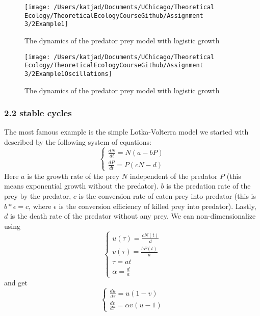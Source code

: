 \documentclass[
]{article}
\begin{document}
\begin{figure}
\centering
\texttt{[image: /Users/katjad/Documents/UChicago/Theoretical Ecology/TheoreticalEcologyCourseGithub/Assignment 3/2Example1]}
\caption{The dynamics of the predator prey model with logistic growth}
\end{figure}

\begin{figure}
\centering
\texttt{[image: /Users/katjad/Documents/UChicago/Theoretical Ecology/TheoreticalEcologyCourseGithub/Assignment 3/2Example1Oscillations]}
\caption{The dynamics of the predator prey model with logistic growth}
\end{figure}

\hypertarget{stable-cycles}{%
\subsubsection{2.2 stable cycles}\label{stable-cycles}}

The most famous example is the simple Lotka-Volterra model we started
with described by the following system of equations: \[
\begin{cases}
\frac{dN}{dt}=N(a-bP)\\
\frac{dP}{dt}=P(cN-d)
\end{cases}
\] Here \(a\) is the growth rate of the prey \(N\) independent of the
predator \(P\) (this means exponential growth without the predator).
\(b\) is the predation rate of the prey by the predator, \(c\) is the
conversion rate of eaten prey into predator (this is \(b*\epsilon=c\),
where \(\epsilon\) is the conversion efficiency of killed prey into
predator). Lastly, \(d\) is the death rate of the predator without any
prey. We can non-dimensionalize using \[
\begin{cases}
u(\tau)=\frac{cN(t)}{d}\\
v(\tau)=\frac{bP(t)}{a}\\
\tau=at\\
\alpha=\frac{d}{a}
\end{cases}
\] and get \[
\begin{cases}
\frac{du}{d\tau}=u(1-v)\\
\frac{dv}{d\tau}=\alpha v(u-1)
\end{cases}
\]
\end{document}
